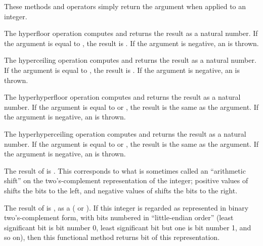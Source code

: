 These methods and operators simply return the argument when applied to an integer.



The hyperfloor operation  computes 
and returns the result as a natural number.
If the argument is equal to , the result is .
If the argument is negative, an  is thrown.

The hyperceiling operation  computes 
and returns the result as a natural number.
If the argument is equal to , the result is .
If the argument is negative, an  is thrown.

The hyperhyperfloor operation  computes 
and returns the result as a natural number.
If the argument is equal to  or , the result is the same as the argument.
If the argument is negative, an  is thrown.

The hyperhyperceiling operation  computes 
and returns the result as a natural number.
If the argument is equal to  or , the result is the same as the argument.
If the argument is negative, an  is thrown.



The result of  is .
This corresponds to what is sometimes called an ``arithmetic shift''
on the two's-complement representation of the integer;
positive values of  shifts the bits to the left,
and negative values of  shifts the bits to the right.



The result of  is , as a  ( or ).
If this integer is regarded as represented in binary two's-complement form,
with bits numbered in ``little-endian order'' (least significant bit is bit number 0,
least significant bit but one is bit number 1, and so on), then this functional
method returns bit  of this representation.


